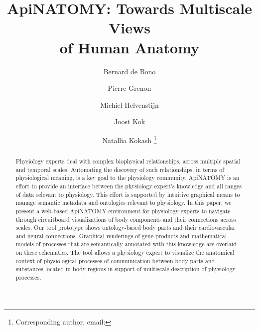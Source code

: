 \documentclass[runningheads]{llncs}                                                      %
\begin{document}

\title{ApiNATOMY: Towards Multiscale Views\\of Human Anatomy}

\author{
  Bernard de Bono
  \and
  Pierre Grenon
  \and
  Michiel Helvenstijn
  \and 	
  Joost Kok
  \and
  Natallia Kokash
  \fnmsep
  \thanks{Corresponding author, email: }
}


\maketitle

\setlength{\subfigcapskip}{0.1cm}
\setlength{\abovecaptionskip}{0cm}
\setlength{\belowcaptionskip}{0cm}
\setlength{\textfloatsep}{10pt plus 1.0pt minus 2.0pt}


\begin{abstract}
Physiology experts deal with complex biophysical relationships, across multiple spatial and temporal scales.
Automating the discovery of such relationships, in terms of physiological meaning, is a key goal to the physiology community.
ApiNATOMY is an effort to provide an interface between the physiology expert's knowledge and all ranges of data relevant to physiology. 
This effort is supported by intuitive graphical means to manage semantic metadata and ontologies relevant to physiology.
In this paper, we present a web-based ApiNATOMY environment for physiology experts to navigate through circuitboard visualizations of body components and their connections across scales. Our tool prototype shows ontology-based body parts and their cardiovascular and neural connections. Graphical renderings of gene products and mathematical models of processes that are semantically annotated with this knowledge are overlaid on these schematics. The tool allows a physiology expert to visualize the anatomical context of physiological processes of communication between body parts and substances located in body regions in support of multiscale description of physiology processes.



\end{abstract}













\end{document}
